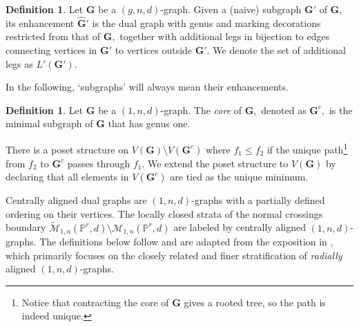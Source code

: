 \documentclass[12pt,reqno]{amsart}
\theoremstyle{definition}
\theoremstyle{definition}
\theoremstyle{definition}
\theoremstyle{definition}
\newtheorem{definition}[theorem]{Definition}
\newcommand{\Mtil}{\widetilde{\mathcal{M}}}
\begin{document}
\begin{definition}
  Let $\mathbf{G}$ be a $(g,n,d)$-graph. Given a (naive) subgraph $\mathbf{G}'$ of $\mathbf{G}$, its enhancement $\hat{\mathbf{G}}'$ is the dual graph with genus and marking decorations restricted from that of $\mathbf{G},$ together with additional legs in bijection to edges connecting vertices in $\mathbf{G}'$ to vertices outside $\mathbf{G}'.$ We denote the set of additional legs as $L'(\mathbf{G}').$
\end{definition}

In the following, `subgraphs' will always mean their enhancements.

\begin{definition}
  Let $\mathbf{G}$ be a $(1,n,d)$-graph. The \emph{core} of $\mathbf{G},$ denoted as  $\mathbf{G}^{c},$ is the minimal subgraph of $\mathbf{G}$ that has genus one.

  There is a poset structure on $V(\mathbf{G})\setminus V(\mathbf{G}^c)$ where $f_1\leq f_2$ if the unique path\footnote{Notice that contracting the core of $\mathbf{G}$ gives a rooted tree, so the path is indeed unique.} from $f_2$ to $\mathbf{G}^{c}$ passes through $f_1$. We extend the poset structure to $V(\mathbf{G})$ by declaring that all elements in $V(\mathbf{G}^c)$ are tied as the unique minimum.
\end{definition}

Centrally aligned dual graphs are $(1,n,d)$-graphs with a partially defined ordering on their vertices. The locally closed strata of the normal crossings boundary $\Mtil_{1,n}(\mathbb{P}^r,d)\setminus \mathcal{M}_{1,n}(\mathbb{P}^r,d)$ are labeled by centrally aligned $(1,n,d)$-graphs. The definitions below follow \cite{rspw} and are adapted from the exposition in \cite{vzdualcomplex}, which primarily focuses on the closely related and finer stratification of \emph{radially} aligned $(1,n,d)$-graphs.
\end{document}

